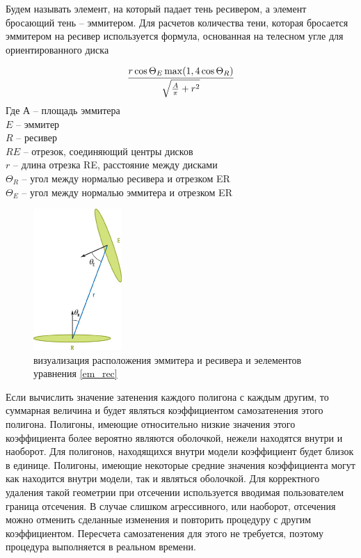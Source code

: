 Будем называть элемент, на который падает тень ресивером, а элемент бросающий тень  -- эммитером. Для расчетов количества тени, которая бросается эммитером на ресивер используется формула, основанная на телесном угле для ориентированного диска 


\begin{equation}
	{{r\cos{\Theta_E \max(1, 4\cos{\Theta_R})}}\over{\sqrt{{A\over\pi} + r^2}}}
	\label{em_rec}
\end{equation}
Где $А$ -- площадь эммитера\\
$E$ -- эммитер\\
$R$ -- ресивер\\
$RE$ -- отрезок, соединяющий центры дисков\\
$r$ -- длина отрезка RE, расстояние между дисками\\
$\Theta_R$ -- угол между нормалью ресивера и отрезком ER\\
$\Theta_E$ -- угол между нормалью эммитера и отрезком ER\\

\begin{figure}[h]
	\center
	\includegraphics[width=0.3\textwidth]{14_ambient_occlusion_03}
	\caption{визуализация расположения эммитера и ресивера и эелементов уравнения \ref{em_rec}}\label{fig:ao03}
\end{figure}

Если вычислить значение затенения каждого полигона с каждым другим, то суммарная величина и будет являться коэффициентом самозатенения этого полигона. Полигоны, имеющие относительно низкие значения этого коэффициента более вероятно являются оболочкой, нежели находятся внутри и наоборот. Для полигонов, находящихся внутри модели коэффициент будет близок в единице. Полигоны, имеющие некоторые средние значения коэффициента могут как находится внутри модели, так и являться оболочкой. Для корректного удаления такой геометрии при отсечении используется вводимая пользователем граница отсечения. В случае слишком агрессивного, или наоборот, отсечения можно отменить сделанные изменения и повторить процедуру с другим коэффициентом. Пересчета самозатенения для этого не требуется, поэтому процедура выполняется в реальном времени.

